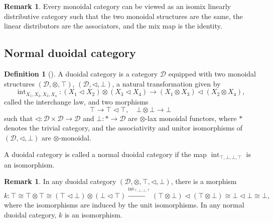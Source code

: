 \documentclass{article}
\numberwithin{equation}{section}
\theoremstyle{definition}
\newtheorem{definition}[thm]{Definition}
\newtheorem{rem}[thm]{Remark}
\begin{document}
\begin{rem}Every monoidal category can be viewed as an isomix linearly distributive category such that the two monoidal structures are the same, the linear distributors are the associators, and the mix map is the identity.
\end{rem}



































\subsection{Normal duoidal category}
\begin{definition}[\cite{SS}]A duoidal category is a category $\mathcal{D}$ equipped with two monoidal structures $(\mathcal{D}, \otimes, \top)$, $(\mathcal{D}, \triangleleft, \bot)$, a natural transformation given by
\[\operatorname{int}_{X_1, X_2, X_3, X_4}:(X_1\triangleleft X_2)\otimes(X_3\triangleleft X_4)\to (X_1\otimes X_3)\triangleleft (X_2\otimes X_4),\]
called the interchange law, and two morphisms
\[\top\to\top\triangleleft\top, \quad \bot\otimes\bot\to\bot\]
such that $\triangleleft:\mathcal{D}\times\mathcal{D}\to\mathcal{D}$ and $\bot:*\to\mathcal{D}$ are $\otimes$-lax monoidal functors, where $*$ denotes the trivial category, and the associativity and unitor isomorphisms of $(\mathcal{D}, \triangleleft, \bot)$ are $\otimes$-monoidal.

A duoidal category is called a normal duoidal category if the map $\operatorname{int}_{\top, \bot, \bot, \top}$ is an isomorphism.

\end{definition}

\begin{rem}In any duoidal category $(\mathcal{D}, \otimes, \top, \triangleleft, \bot)$, there is a morphism
\[k:\top\cong\top\otimes\top\cong(\top\triangleleft\bot)\otimes(\bot\triangleleft\top)\xrightarrow{\operatorname{int}_{\top, \bot, \bot, \top}}(\top\otimes\bot)\triangleleft(\top\otimes\bot)\cong\bot\triangleleft\bot\cong\bot,\]
where the isomorphisms are induced by the unit isomorphisms.
In any normal duoidal category, $k$ is an isomorphism.
\end{rem}
\end{document}
